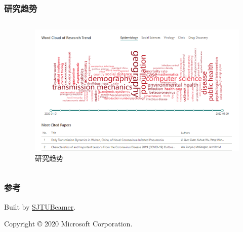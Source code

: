 \documentclass[UTF8,aspectratio=169]{ctexbeamer}
\begin{document}
    \begin{frame}
        \frametitle{研究趋势}
        \begin{columns}
            \begin{column}{0.4\textwidth}

                
            \end{column}
            \begin{column}{0.6\textwidth}
                \begin{figure}[H]
                    \includegraphics[width=\linewidth]{research}
                    \caption{研究趋势\cite{msraen}}\label{fig:research}
                \end{figure}
            \end{column}
        \end{columns}
    \end{frame}

    \begin{frame}
        \frametitle{参考}
        
        \vfill
        Built by \href{https://github.com/sjtug/SJTUBeamer}{SJTUBeamer}.

        Copyright \copyright{} 2020 Microsoft Corporation.
    \end{frame}

    \makebottom
\end{document}
